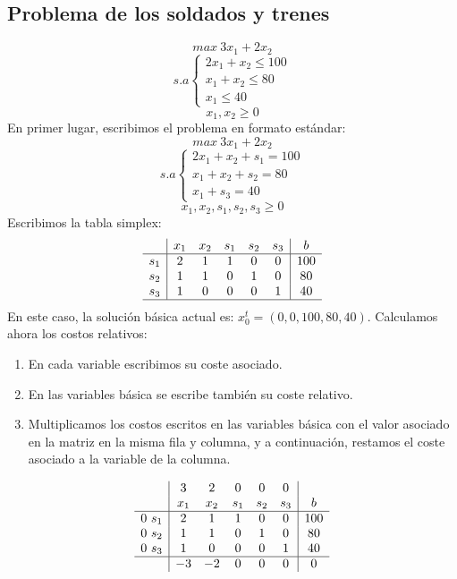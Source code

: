 \documentclass[11pt,fleqn]{book} %
\begin{document}
\subsection{Problema de los soldados y trenes}
$$ max ~ 3x_1+2x_2 $$
$$ s.a \left\{
\begin{array}{c}
  2x_1+x_2 \leq 100 \\
  x_1+x_2 \leq 80 \\
  x_1 \leq 40
\end{array}
\right.
$$
$$ x_1, x_2 \geq 0$$
En primer lugar, escribimos el problema en formato estándar:
$$ max ~ 3x_1+2x_2 $$
$$ s.a \left\{
\begin{array}{c}
  2x_1+x_2 + s_1 = 100 \\
  x_1+x_2 + s_2 =  80 \\
  x_1 + s_3 =  40
\end{array}
\right.
$$
$$ x_1, x_2, s_1, s_2, s_3 \geq 0$$
Escribimos la tabla simplex:
$$
\begin{array}{c|ccccc|c}
  & x_1 & x_2 & s_1 & s_2 & s_3 & b \\ \hline
  s_1 & 2 & 1 & 1 & 0 & 0 & 100 \\
  s_2 & 1 & 1 & 0 & 1 & 0 & 80 \\
  s_3 & 1 & 0 & 0 & 0 & 1 & 40 \\ \hline
\end{array}
$$
En este caso, la solución básica actual es: $x_0^t=(0, 0, 100, 80, 40)$. \newpage
Calculamos ahora los costos relativos:
\begin{enumerate}
\item En cada variable escribimos su coste asociado.
\item En las variables básica se escribe también su coste relativo.
\item Multiplicamos los costos escritos en las variables básica con el valor asociado en la matriz en la misma fila y columna, y a continuación, restamos el coste asociado a la variable de la columna.
\end{enumerate}
$$
\begin{array}{c|ccccc|c}
  & 3 & 2 & 0 & 0 & 0 & \\
  & x_1 & x_2 & s_1 & s_2 & s_3 & b \\ \hline
  0 ~ s_1 & 2 & 1 & 1 & 0 & 0 & 100 \\
  0 ~s_2 & 1 & 1 & 0 & 1 & 0 & 80 \\
  0 ~ s_3 & 1 & 0 & 0 & 0 & 1 & 40 \\ \hline 
  & -3 & -2 & 0 & 0 & 0 & 0
\end{array}
$$
\end{document}
